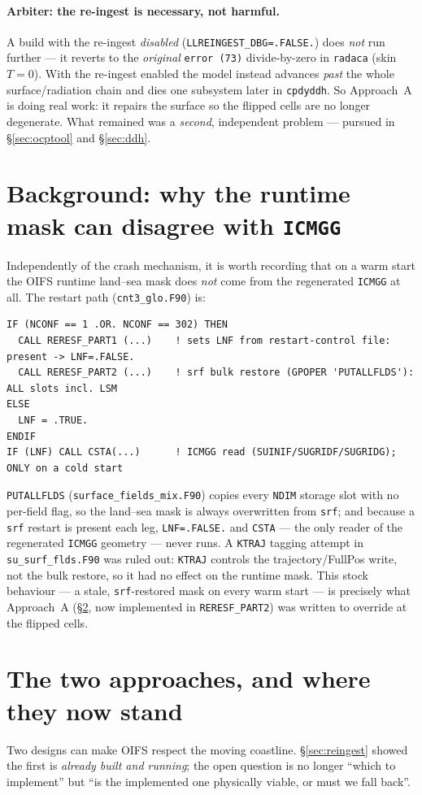 \documentclass[11pt,a4paper]{article}
\newcommand{\code}[1]{\texttt{\small #1}}
\newcommand{\file}[1]{\texttt{\footnotesize #1}}
\begin{document}
\paragraph{Arbiter: the re-ingest is necessary, not harmful.} A build with the re-ingest
\emph{disabled} (\code{LLREINGEST\_DBG=.FALSE.}) does \emph{not} run further --- it reverts
to the \emph{original} \code{error (73)} divide-by-zero in \code{radaca} (skin~$T=0$). With
the re-ingest enabled the model instead advances \emph{past} the whole surface/radiation
chain and dies one subsystem later in \code{cpdyddh}. So Approach~A is doing real work:
it repairs the surface so the flipped cells are no longer degenerate. What remained was a
\emph{second}, independent problem --- pursued in \S\ref{sec:ocptool} and
\S\ref{sec:ddh}.

\section{Background: why the runtime mask can disagree with \code{ICMGG}}
Independently of the crash mechanism, it is worth recording that on a warm start the OIFS
runtime land--sea mask does \emph{not} come from the regenerated \code{ICMGG} at all. The
restart path (\file{cnt3\_glo.F90}) is:
\begin{lstlisting}
IF (NCONF == 1 .OR. NCONF == 302) THEN
  CALL RERESF_PART1 (...)    ! sets LNF from restart-control file: present -> LNF=.FALSE.
  CALL RERESF_PART2 (...)    ! srf bulk restore (GPOPER 'PUTALLFLDS'): ALL slots incl. LSM
ELSE
  LNF = .TRUE.
ENDIF
IF (LNF) CALL CSTA(...)      ! ICMGG read (SUINIF/SUGRIDF/SUGRIDG); ONLY on a cold start
\end{lstlisting}
\code{PUTALLFLDS} (\file{surface\_fields\_mix.F90}) copies every \code{NDIM} storage slot
with no per-field flag, so the land--sea mask is always overwritten from \code{srf}; and
because a \code{srf} restart is present each leg, \code{LNF=.FALSE.} and \code{CSTA} ---
the only reader of the regenerated \code{ICMGG} geometry --- never runs. A \code{KTRAJ}
tagging attempt in \file{su\_surf\_flds.F90} was ruled out: \code{KTRAJ} controls the
trajectory/FullPos write, not the bulk restore, so it had no effect on the runtime mask.
This stock behaviour --- a stale, \code{srf}-restored mask on every warm start --- is
precisely what Approach~A (\S\ref{sec:fixes}, now implemented in \code{RERESF\_PART2}) was
written to override at the flipped cells.

\section{The two approaches, and where they now stand}\label{sec:fixes}
Two designs can make OIFS respect the moving coastline. \S\ref{sec:reingest} showed the
first is \emph{already built and running}; the open question is no longer ``which to
implement'' but ``is the implemented one physically viable, or must we fall back''.
\end{document}
